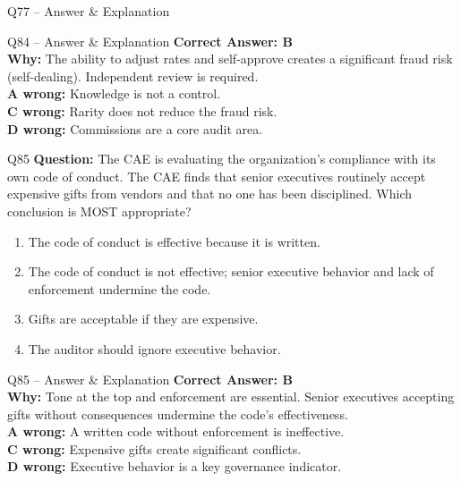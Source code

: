 \documentclass[aspectratio=169,10pt]{beamer}
\begin{document}
\begin{frame}[t]{Q77 -- Answer \& Explanation}
	\begin{frame}[t]{Q84 -- Answer \& Explanation}
		\small
		\textbf{Correct Answer: B} \\[4pt]
		\textbf{Why:} The ability to adjust rates and self-approve creates a significant fraud risk (self-dealing). Independent review is required. \\[4pt]
		\textbf{A wrong:} Knowledge is not a control. \\[2pt]
		\textbf{C wrong:} Rarity does not reduce the fraud risk. \\[2pt]
		\textbf{D wrong:} Commissions are a core audit area.
	\end{frame}
	
	\begin{frame}[t]{Q85}
		\small
		\textbf{Question:} The CAE is evaluating the organization's compliance with its own code of conduct. The CAE finds that senior executives routinely accept expensive gifts from vendors and that no one has been disciplined. Which conclusion is MOST appropriate?
		\begin{enumerate}[label=\Alph*.,itemsep=1pt,topsep=2pt]
			\item The code of conduct is effective because it is written.
			\item The code of conduct is not effective; senior executive behavior and lack of enforcement undermine the code.
			\item Gifts are acceptable if they are expensive.
			\item The auditor should ignore executive behavior.
		\end{enumerate}
	\end{frame}
	
	\begin{frame}[t]{Q85 -- Answer \& Explanation}
		\small
		\textbf{Correct Answer: B} \\[4pt]
		\textbf{Why:} Tone at the top and enforcement are essential. Senior executives accepting gifts without consequences undermine the code's effectiveness. \\[4pt]
		\textbf{A wrong:} A written code without enforcement is ineffective. \\[2pt]
		\textbf{C wrong:} Expensive gifts create significant conflicts. \\[2pt]
		\textbf{D wrong:} Executive behavior is a key governance indicator.
	\end{frame}
	

\end{frame}
\end{document}

